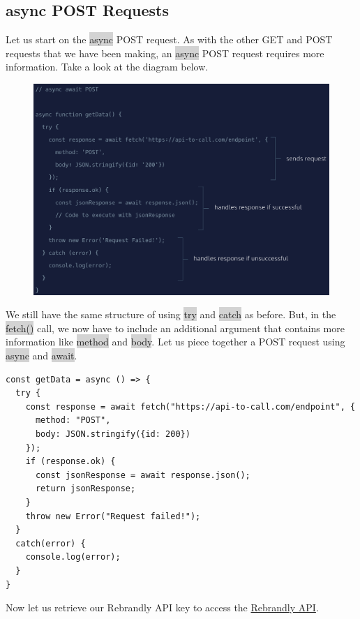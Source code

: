 \documentclass[11pt]{article}
\begin{document}
\subsection{async POST Requests}
Let us start on the \colorbox{lightgray}{async} POST request. As with the other GET and POST requests that we have been making, an \colorbox{lightgray}{async} POST request requires more information. Take a look at the diagram below.
\begin{figure}[H]
\includegraphics[scale = 0.35]{18_6}
\centering
\end{figure}
We still have the same structure of using \colorbox{lightgray}{try} and \colorbox{lightgray}{catch} as before. But, in the \colorbox{lightgray}{fetch()} call, we now have to include an additional argument that contains more information like \colorbox{lightgray}{method} and \colorbox{lightgray}{body}. Let us piece together a POST request using \colorbox{lightgray}{async} and \colorbox{lightgray}{await}.
\begin{lstlisting}
const getData = async () => {
  try {
    const response = await fetch("https://api-to-call.com/endpoint", {
      method: "POST", 
      body: JSON.stringify({id: 200})
    });
    if (response.ok) {
      const jsonResponse = await response.json(); 
      return jsonResponse; 
    }
    throw new Error("Request failed!");
  }
  catch(error) {
    console.log(error);
  }
}
\end{lstlisting}
Now let us retrieve our Rebrandly API key to access the \href{https://app.rebrandly.com/account/api-keys}{Rebrandly API}. 
\end{document}
